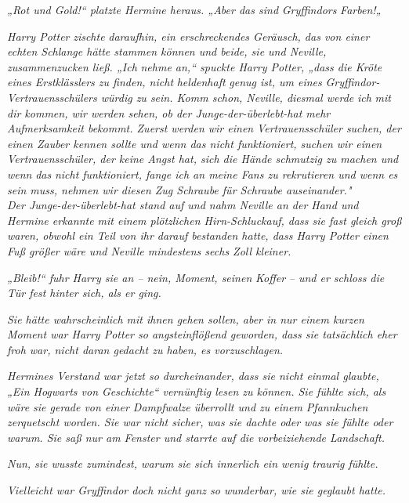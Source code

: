 {\emph{„\emph{Rot und Gold!}“ platzte Hermine heraus. „Aber das sind} \emph{\emph{Gryffindors}} \emph{Farben!„}

\emph{Harry Potter} \emph{\emph{zischte}} \emph{daraufhin, ein erschreckendes Geräusch, das von einer echten Schlange hätte stammen können und beide, sie und Neville, zusammenzucken ließ. „Ich} \emph{\emph{nehme an}\emph{,}“ spuckte Harry Potter, „dass die Kröte eines Erstklässlers zu finden, nicht} \emph{\emph{heldenhaft}} \emph{genug ist, um eines} \emph{\emph{Gryffindor}-Vertrauensschülers würdig zu sein. Komm schon, Neville, diesmal werde} \emph{\emph{ich}} \emph{mit dir kommen, wir werden sehen, ob der Junge-der-überlebt-hat mehr Aufmerksamkeit bekommt. Zuerst werden wir einen} \emph{Vertrauensschüler suchen, der einen Zauber kennen sollte und wenn das nicht funktioniert, suchen wir einen Vertrauensschüler, der keine Angst hat, sich die Hände schmutzig zu machen und wenn} \emph{\emph{das}} \emph{nicht funktioniert, fange ich an meine Fans zu rekrutieren und wenn es sein muss, nehmen wir diesen Zug Schraube für Schraube auseinander."}\\ \emph{Der Junge-der-überlebt-hat stand auf und nahm Neville an der Hand und Hermine erkannte mit einem plötzlichen Hirn-Schluckauf, dass sie fast gleich groß waren, obwohl ein Teil von ihr darauf bestanden hatte, dass Harry Potter einen Fuß größer wäre und Neville mindestens sechs Zoll kleiner.}

\emph{„\emph{Bleib!}“ fuhr Harry sie an -- nein, Moment, seinen} \emph{\emph{Koffer}} \emph{-- und er schloss die Tür fest hinter sich, als er ging.}

\emph{Sie hätte wahrscheinlich mit ihnen gehen sollen, aber in nur einem kurzen Moment war Harry Potter so angsteinflößend geworden, dass sie tatsächlich eher froh war, nicht daran gedacht zu haben, es vorzuschlagen.}

\emph{Hermines Verstand war jetzt so durcheinander, dass sie nicht einmal glaubte, „Ein Hogwarts von Geschichte“ vernünftig lesen zu können. Sie fühlte sich, als wäre sie gerade von einer Dampfwalze überrollt und zu einem Pfannkuchen zerquetscht worden. Sie war nicht sicher, was sie dachte oder was sie fühlte oder warum. Sie saß nur am Fenster und starrte auf die vorbeiziehende Landschaft.}

\emph{Nun, sie wusste zumindest, warum sie sich innerlich ein wenig traurig fühlte.}

\emph{Vielleicht war Gryffindor doch nicht ganz so wunderbar, wie sie geglaubt hatte.}

}

